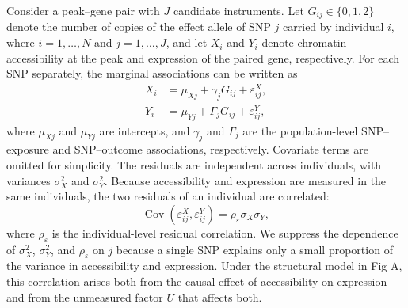 \noindent Consider a peak--gene pair with $J$ candidate instruments. Let $G_{ij}\in\{0,1,2\}$ denote the number of copies of the effect allele of SNP $j$ carried by individual $i$, where $i=1,\ldots,N$ and $j=1,\ldots,J$, and let $X_i$ and $Y_i$ denote chromatin accessibility at the peak and expression of the paired gene, respectively. For each SNP separately, the marginal associations can be written as
\begin{align*}
X_i &= \mu_{Xj} + \gamma_j G_{ij} + \varepsilon_{ij}^{X}, \\
Y_i &= \mu_{Yj} + \Gamma_j G_{ij} + \varepsilon_{ij}^{Y},
\end{align*}
where $\mu_{Xj}$ and $\mu_{Yj}$ are intercepts, and $\gamma_j$ and $\Gamma_j$ are the population-level SNP--exposure and SNP--outcome associations, respectively. Covariate terms are omitted for simplicity. The residuals are independent across individuals, with variances $\sigma_X^2$ and $\sigma_Y^2$. Because accessibility and expression are measured in the same individuals, the two residuals of an individual are correlated:
\begin{equation*}
\operatorname{Cov}(\varepsilon_{ij}^{X},\varepsilon_{ij}^{Y})=\rho_\varepsilon\sigma_X\sigma_Y,
\end{equation*}
where $\rho_\varepsilon$ is the individual-level residual correlation. We suppress the dependence of $\sigma_X^2$, $\sigma_Y^2$, and $\rho_\varepsilon$ on $j$ because a single SNP explains only a small proportion of the variance in accessibility and expression. Under the structural model in Fig A, this correlation arises both from the causal effect of accessibility on expression and from the unmeasured factor $U$ that affects both.

